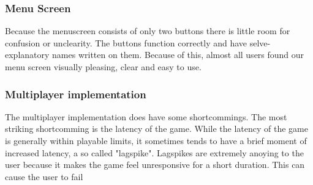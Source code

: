 \subsubsection*{Menu Screen}
Because the menuscreen consists of only two buttons there is little room for confusion or unclearity. The buttons function correctly and have selve-explanatory names written on them. Because of this, almost all users found our menu screen visually pleasing, clear and easy to use.

\subsubsection*{Multiplayer implementation}
The multiplayer implementation does have some shortcommings. The most striking shortcomming is the latency of the game. While the latency of the game is generally within playable limits, it sometimes tends to have a brief moment of increased latency, a so called "lagspike". Lagspikes are extremely anoying to the user because it makes the game feel unresponsive for a short duration. This can cause the user to fail 




